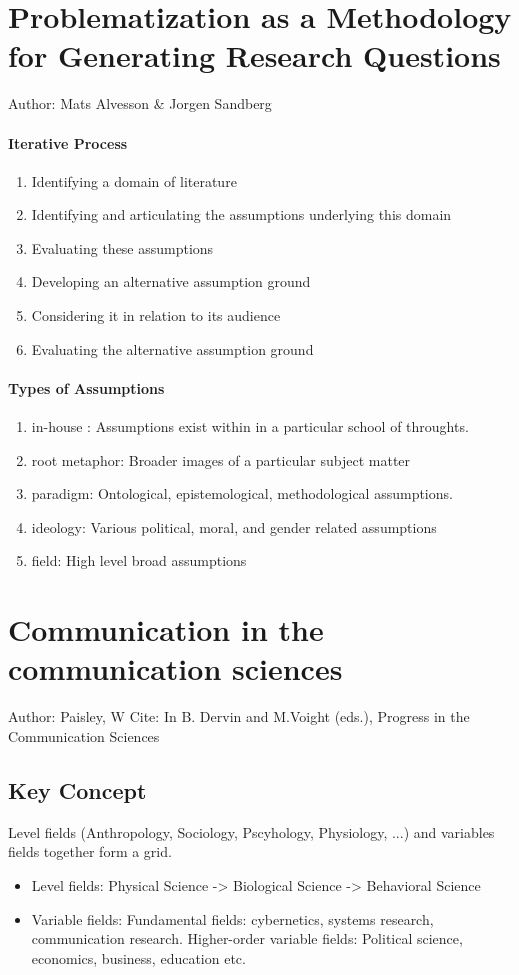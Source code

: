 \section{Problematization as a Methodology for Generating Research Questions}
Author: Mats Alvesson \& Jorgen Sandberg 

\paragraph{Iterative Process} 
\begin{enumerate}
    \item Identifying a domain of literature 
    \item Identifying and articulating the assumptions underlying this domain 
    \item Evaluating these assumptions 
    \item Developing an alternative assumption ground 
    \item Considering it in relation to its audience 
    \item Evaluating the alternative assumption ground 
\end{enumerate}
\paragraph{Types of Assumptions} 
\begin{enumerate}
    \item in-house : Assumptions exist within in a particular school of throughts. 
    \item root metaphor: Broader images of a particular subject matter
    \item paradigm: Ontological, epistemological, methodological assumptions. 
    \item ideology: Various political, moral, and gender related assumptions 
    \item field: High level broad assumptions
\end{enumerate}





\section{Communication in the communication sciences}
Author: Paisley, W 
Cite: In B. Dervin and M.Voight (eds.), Progress in the Communication Sciences
\subsection{Key Concept}
Level fields (Anthropology, Sociology, Pscyhology, Physiology, ...) and variables fields together form a grid. 
    \begin{itemize}
        \item Level fields: Physical Science -> Biological Science -> Behavioral Science
        \item Variable fields: Fundamental fields: cybernetics, systems research, communication research. Higher-order variable fields: Political science, economics, business, education etc. 
    \end{itemize}


